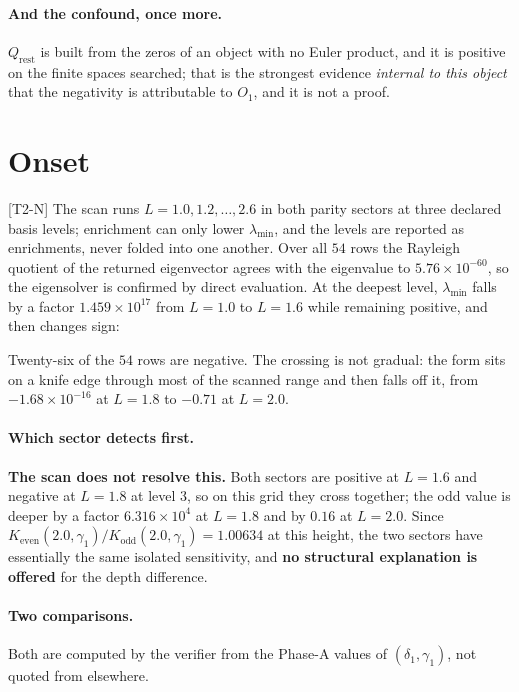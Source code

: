 \documentclass[11pt,a4paper]{article}
\theoremstyle{definition}
\theoremstyle{remark}
\newcommand{\tier}[1]{{\small\textsf{[#1]}}}
\newcommand{\lmin}{\lambda_{\min}}
\newcommand{\Qrest}{Q_{\mathrm{rest}}}
\begin{document}
\paragraph{And the confound, once more.} $\Qrest$ is built from the zeros of an object
with no Euler product, and it is positive on the finite spaces searched; that is the
strongest evidence \emph{internal to this object} that the negativity is attributable to
$O_1$, and it is not a proof.

\section{Onset}\label{sec:onset}

\tier{T2-N} The scan runs $L = 1.0,1.2,\ldots,2.6$ in both parity sectors at three
declared basis levels; enrichment can only lower $\lmin$, and the levels are reported as
enrichments, never folded into one another. Over all $54$ rows the Rayleigh quotient of
the returned eigenvector agrees with the eigenvalue to $5.76\times10^{-60}$, so the
eigensolver is confirmed by direct evaluation. At the deepest level, $\lmin$ falls by a
factor $1.459\times10^{17}$ from $L=1.0$ to $L=1.6$ while remaining positive, and then
changes sign:



\noindent Twenty-six of the $54$ rows are negative. The crossing is not gradual: the form
sits on a knife edge through most of the scanned range and then falls off it, from
$-1.68\times10^{-16}$ at $L=1.8$ to $-0.71$ at $L=2.0$.

\paragraph{Which sector detects first.} \textbf{The scan does not resolve this.} Both
sectors are positive at $L=1.6$ and negative at $L=1.8$ at level $3$, so on this grid they
cross together; the odd value is deeper by a factor $6.316\times10^{4}$ at $L=1.8$ and
by $0.16$ at $L=2.0$. Since $K_{\mathrm{even}}(2.0,\gamma_1)/K_{\mathrm{odd}}(2.0,\gamma_1)
= 1.00634$ at this height, the two sectors have essentially the same isolated
sensitivity, and \textbf{no structural explanation is offered} for the depth difference.

\paragraph{Two comparisons.} Both are computed by the verifier from the Phase-A values of
$(\delta_1,\gamma_1)$, not quoted from elsewhere.
\end{document}
